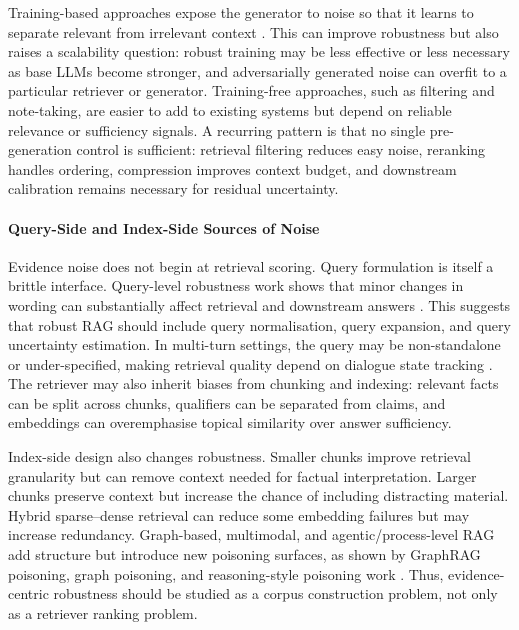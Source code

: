 Training-based approaches expose the generator to noise so that it learns to separate relevant from irrelevant context \citep{raat2024,rrag091}. This can improve robustness but also raises a scalability question: robust training may be less effective or less necessary as base LLMs become stronger, and adversarially generated noise can overfit to a particular retriever or generator. Training-free approaches, such as filtering and note-taking, are easier to add to existing systems but depend on reliable relevance or sufficiency signals. A recurring pattern is that no single pre-generation control is sufficient: retrieval filtering reduces easy noise, reranking handles ordering, compression improves context budget, and downstream calibration remains necessary for residual uncertainty.

\paragraph{Query-Side and Index-Side Sources of Noise}

Evidence noise does not begin at retrieval scoring. Query formulation is itself a brittle interface. Query-level robustness work shows that minor changes in wording can substantially affect retrieval and downstream answers \citep{queryRobustness2025}. This suggests that robust RAG should include query normalisation, query expansion, and query uncertainty estimation. In multi-turn settings, the query may be non-standalone or under-specified, making retrieval quality depend on dialogue state tracking \citep{rrag141}. The retriever may also inherit biases from chunking and indexing: relevant facts can be split across chunks, qualifiers can be separated from claims, and embeddings can overemphasise topical similarity over answer sufficiency.

Index-side design also changes robustness. Smaller chunks improve retrieval granularity but can remove context needed for factual interpretation. Larger chunks preserve context but increase the chance of including distracting material. Hybrid sparse--dense retrieval can reduce some embedding failures but may increase redundancy. Graph-based, multimodal, and agentic/process-level RAG add structure but introduce new poisoning surfaces, as shown by GraphRAG poisoning, graph poisoning, and reasoning-style poisoning work \citep{rrag051,rrag127,rrag175}. Thus, evidence-centric robustness should be studied as a corpus construction problem, not only as a retriever ranking problem.

